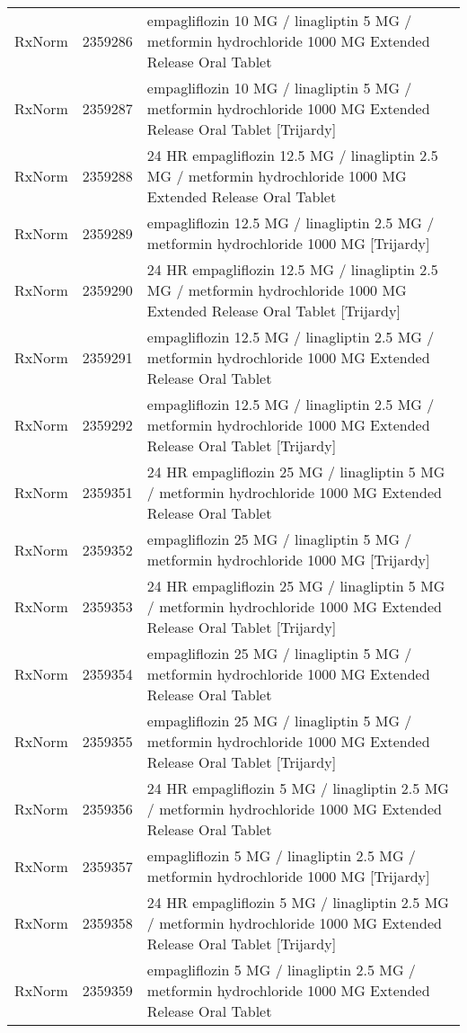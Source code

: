 \begin{longtable}{p{}p{}p{}}
  RxNorm & 2359286 & empagliflozin 10 MG / linagliptin 5 MG / metformin hydrochloride 1000 MG Extended Release Oral Tablet \\ 
  RxNorm & 2359287 & empagliflozin 10 MG / linagliptin 5 MG / metformin hydrochloride 1000 MG Extended Release Oral Tablet [Trijardy] \\ 
  RxNorm & 2359288 & 24 HR empagliflozin 12.5 MG / linagliptin 2.5 MG / metformin hydrochloride 1000 MG Extended Release Oral Tablet \\ 
  RxNorm & 2359289 & empagliflozin 12.5 MG / linagliptin 2.5 MG / metformin hydrochloride 1000 MG [Trijardy] \\ 
  RxNorm & 2359290 & 24 HR empagliflozin 12.5 MG / linagliptin 2.5 MG / metformin hydrochloride 1000 MG Extended Release Oral Tablet [Trijardy] \\ 
  RxNorm & 2359291 & empagliflozin 12.5 MG / linagliptin 2.5 MG / metformin hydrochloride 1000 MG Extended Release Oral Tablet \\ 
  RxNorm & 2359292 & empagliflozin 12.5 MG / linagliptin 2.5 MG / metformin hydrochloride 1000 MG Extended Release Oral Tablet [Trijardy] \\ 
  RxNorm & 2359351 & 24 HR empagliflozin 25 MG / linagliptin 5 MG / metformin hydrochloride 1000 MG Extended Release Oral Tablet \\ 
  RxNorm & 2359352 & empagliflozin 25 MG / linagliptin 5 MG / metformin hydrochloride 1000 MG [Trijardy] \\ 
  RxNorm & 2359353 & 24 HR empagliflozin 25 MG / linagliptin 5 MG / metformin hydrochloride 1000 MG Extended Release Oral Tablet [Trijardy] \\ 
  RxNorm & 2359354 & empagliflozin 25 MG / linagliptin 5 MG / metformin hydrochloride 1000 MG Extended Release Oral Tablet \\ 
  RxNorm & 2359355 & empagliflozin 25 MG / linagliptin 5 MG / metformin hydrochloride 1000 MG Extended Release Oral Tablet [Trijardy] \\ 
  RxNorm & 2359356 & 24 HR empagliflozin 5 MG / linagliptin 2.5 MG / metformin hydrochloride 1000 MG Extended Release Oral Tablet \\ 
  RxNorm & 2359357 & empagliflozin 5 MG / linagliptin 2.5 MG / metformin hydrochloride 1000 MG [Trijardy] \\ 
  RxNorm & 2359358 & 24 HR empagliflozin 5 MG / linagliptin 2.5 MG / metformin hydrochloride 1000 MG Extended Release Oral Tablet [Trijardy] \\ 
  RxNorm & 2359359 & empagliflozin 5 MG / linagliptin 2.5 MG / metformin hydrochloride 1000 MG Extended Release Oral Tablet \\ 

\end{longtable}
